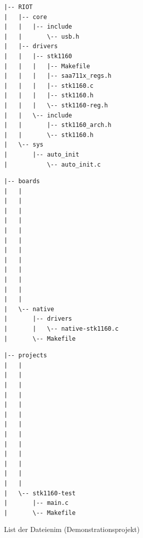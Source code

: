 \begin{landscape}
\begin{figure}[htbp]
  \centering
  \begin{minipage}[b]{9cm}
  \begin{verbatim}
|-- RIOT
|   |-- core
|   |   |-- include
|   |       \-- usb.h
|   |-- drivers
|   |   |-- stk1160
|   |   |   |-- Makefile
|   |   |   |-- saa711x_regs.h
|   |   |   |-- stk1160.c
|   |   |   |-- stk1160.h
|   |   |   \-- stk1160-reg.h
|   |   \-- include
|   |       |-- stk1160_arch.h
|   |       \-- stk1160.h
|   \-- sys
|       |-- auto_init
|           \-- auto_init.c
    \end{verbatim}
 
    \caption{Liste der Dateien des Treibers\newline im \riotrepo \newline(Plattformunabhängiger Teil)}
    \label{fig:srcoverviewriot}
  \end{minipage}
  \begin{minipage}[b]{9cm}
    \begin{verbatim}
|-- boards
|   |
|   |
|   |
|   |
|   |
|   |
|   |
|   |
|   |
|   |
|   |
|   |
|   \-- native
|       |-- drivers
|       |   \-- native-stk1160.c
|       \-- Makefile
    \end{verbatim}
    \caption{Liste der Dateien des Treibers\newline im \boardsrepo \newline(Plattformunabhängiger Teil)}
    \label{fig:srcoverviewboards}
  \end{minipage}
  \begin{minipage}[b]{9cm}
    \begin{verbatim}
|-- projects
|   |
|   |
|   |
|   |
|   |
|   |
|   |
|   |
|   |
|   |
|   |
|   |
|   |
|   \-- stk1160-test
|       |-- main.c
|       \-- Makefile
    \end{verbatim}
    \caption{List der Dateien\newline im \projectsrepo \newline(Demonstrationsprojekt)}
    \label{fig:srcoverviewprojects}
  \end{minipage}
  \end{figure}
\end{landscape}
\restoregeometry

